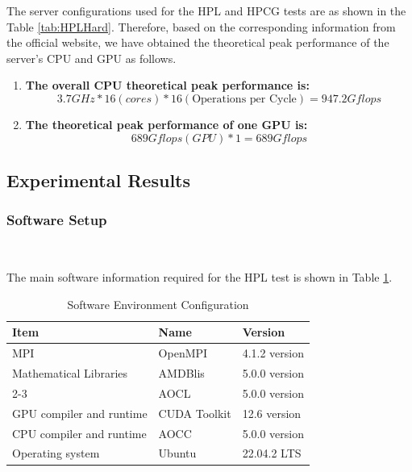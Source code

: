 The server configurations used for the HPL and HPCG tests are as shown in the Table \ref{tab:HPLHard}. 
Therefore, based on the corresponding information from the official website, we have obtained the theoretical peak performance of the server's CPU and GPU as follows.
\begin{enumerate}
    \item \textbf{The overall CPU theoretical peak performance is:}
    \begin{equation}
    3.7GHz*16(cores)*16(\text{Operations per Cycle}){=}947.2 Gflops 
\end{equation}
    \item \textbf{The theoretical peak performance of one GPU is:}
    \begin{equation}
    689 Gflops(GPU)*1{=}689 Gflops
    \end{equation}
\end{enumerate}



\subsection{Experimental Results}


\subsubsection{Software Setup}
\ 


The main software information required for the HPL test is shown in  Table \ref{tab:hpl software}.
\begin{table}[htbp]
\centering
\caption{Software Environment Configuration}
\label{tab:hpl software}
\begin{tabular}{|l|l|l|}
\hline
\rowcolor{myyellow}
\textbf{Item} & \textbf{Name} & \textbf{Version} \\
\hline
MPI & OpenMPI & 4.1.2 version \\
\hline
Mathematical Libraries & AMDBlis & 5.0.0 version \\
\cline{2-3}
& AOCL & 5.0.0 version \\
\hline
GPU compiler and runtime & CUDA Toolkit & 12.6 version \\
\hline
CPU compiler and runtime & AOCC & 5.0.0 version \\
\hline
Operating system & Ubuntu & 22.04.2 LTS \\
\hline
\end{tabular}
\end{table}

